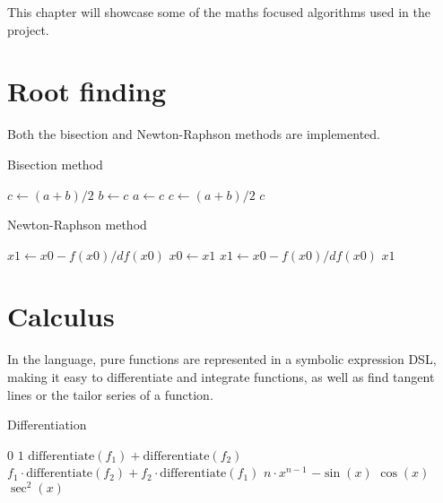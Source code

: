 This chapter will showcase some of the maths focused algorithms used in the project.

\section{Root finding}\label{sec:root-finding}

Both the bisection and Newton-Raphson methods are implemented.

\begin{algorithm}
    \caption{Bisection method}
    \begin{algorithmic}
            \State $c \gets (a + b) / 2$
                    \State $b \gets c$
                \Else
                    \State $a \gets c$
                \EndIf
                \State $c \gets (a + b) / 2$
            \EndWhile
            \State \Return $c$
        \EndFunction
    \end{algorithmic}\label{alg:algorithm2}
\end{algorithm}

\begin{algorithm}
    \caption{Newton-Raphson method}
    \begin{algorithmic}
            \State $x1 \gets x0 - f(x0) / df(x0)$
                \State $x0 \gets x1$
                \State $x1 \gets x0 - f(x0) / df(x0)$
            \EndWhile
            \State \Return $x1$
        \EndFunction
    \end{algorithmic}\label{alg:algorithm3}
\end{algorithm}

\section{Calculus}\label{sec:integration}
In the language, pure functions are represented in a symbolic expression DSL, making it easy to differentiate and 
integrate functions, as well as find tangent lines or the tailor series of a function.

\begin{algorithm}
    \caption{Differentiation}
    \begin{algorithmic}
            \State \Return $0$
            \State \Return $1$
            \State \Return $\text{differentiate}(f_1) + \text{differentiate}(f_2)$
            \State \Return $f_1 \cdot \text{differentiate}(f_2) + f_2 \cdot \text{differentiate}(f_1)$
            \State \Return $n \cdot x^{n-1}$
            \State \Return $-\sin(x)$
            \State \Return $\cos(x)$
            \State \Return $\sec^2(x)$
        \EndIf

        \EndFunction
    \end{algorithmic}\label{alg:algorithm4}
\end{algorithm}

